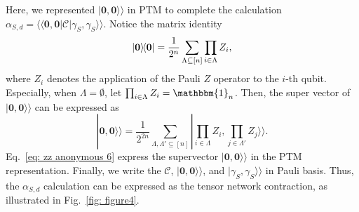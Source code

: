 \documentclass[showpacs,twocolumn,aps,prx,long bibliography,superscriptaddress,notitlepage]{revtex4-1}
\newcommand{\supket}[1]{|#1 \rangle\rangle}
\newcommand{\supbra}[1]{\langle\langle #1 |}
\begin{document}
Here, we represented $\supket{\bm 0,\bm 0}$ in PTM to complete the calculation $\alpha_{S,d} = \supbra{\bm 0,\bm 0} \mathcal{C}\supket{\gamma_S, \gamma_S}$.
Notice the matrix identity 
\begin{equation}
    \ketbra{\bm 0} = \frac{1}{2^n} \sum_{\Lambda\subseteq [n]} \prod_{i \in \Lambda} Z_i,
\end{equation}
where $Z_i$ denotes the application of the Pauli $Z$ operator to the $i$-th qubit.
Especially, when $\Lambda = \emptyset$, let $\prod_{i \in \Lambda} Z_i = \mathbbm{1}_n$. Then, the super vector of $\supket{\bm 0, \bm 0}$ can be expressed as
\begin{equation}
\label{eq: zz anonymous 6}
    \supket{\bm 0, \bm 0} = \frac{1}{2^{2n}} \sum_{\Lambda, \Lambda' \subseteq [n]}  \supket{\prod_{i \in \Lambda }  Z_i, \prod_{j \in \Lambda'} Z_j}.
\end{equation}
Eq.~\eqref{eq: zz anonymous 6} express the supervector $\supket{\bm 0, \bm 0}$ in the PTM representation. Finally, we write the $\mathcal{C}$, $\supket{\bm 0, \bm 0}$, and $\supket{\gamma_S, \gamma_S}$ in Pauli basis.
Thus, the $\alpha_{S,d}$ calculation can be expressed as the tensor network contraction, as illustrated in Fig.~\ref{fig: figure4}.
\end{document}
